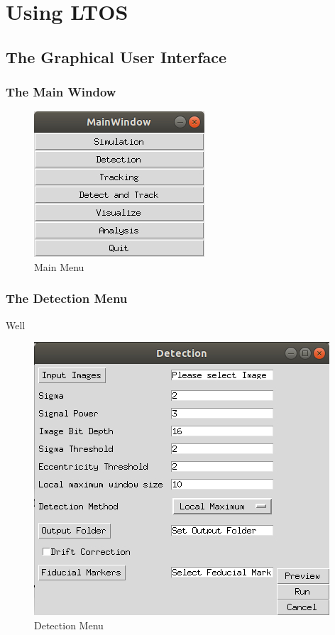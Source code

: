 \documentclass[oneside,letterpaper]{scrartcl}
\newcommand{\PN}{LTOS}
\def\myscale{0.55}
\begin{document}
\section{Using \PN}\parindent 0pt

\subsection{The Graphical User Interface}

\subsubsection{The Main Window}
\begin{figure}
\centering
\includegraphics[scale=\myscale]{Figures/MainGUI.jpg}
\caption{Main Menu}
\end{figure}
\blindtext

\subsubsection{The Detection Menu}
Well
\begin{figure}
\centering
\includegraphics[scale=\myscale]{Figures/DetectionGUI.jpg}
\caption{Detection Menu}
\end{figure}
\Blindtext
\end{document}
